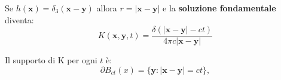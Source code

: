 \documentclass[10pt,a4paper,twoside,openright]{book}
\begin{document}
Se $\displaystyle h(\mathbf{x}) =\delta _{3}(\mathbf{x} -\mathbf{y})$ allora $\displaystyle r=| \mathbf{x} -\mathbf{y}| $ e la \textbf{soluzione fondamentale} diventa:
\begin{equation}
	\boxed{K(\mathbf{x} ,\mathbf{y} ,t) =\frac{\delta (| \mathbf{x} -\mathbf{y}| -ct)}{4\pi c| \mathbf{x} -\mathbf{y}| }}
\end{equation}
\begin{oss}
	Il supporto di K per ogni $\displaystyle t$ è:
	\begin{equation}
		\partial B_{ct}( x) =\{\mathbf{y} :| \mathbf{x} -\mathbf{y}| =ct\} ,
	\end{equation}


	\begin{figure}[H]
		\centering

	\begin{tikzpicture}[x=0.75pt,y=0.75pt,yscale=-1,xscale=1]


\end{tikzpicture}
\end{figure}
\end{oss}
\end{document}
